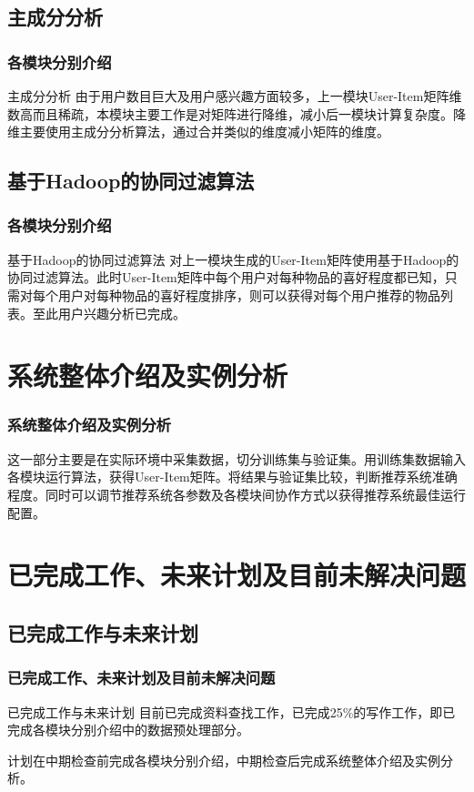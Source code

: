 \documentclass{beamer}
\begin{document}
\subsection{主成分分析}
\begin{frame}
	\frametitle{各模块分别介绍}
		\begin{block}{主成分分析}
		由于用户数目巨大及用户感兴趣方面较多，上一模块User-Item矩阵维数高而且稀疏，本模块主要工作是对矩阵进行降维，减小后一模块计算复杂度。降维主要使用主成分分析算法，通过合并类似的维度减小矩阵的维度。
		\end{block}
\end{frame}

\subsection{基于Hadoop的协同过滤算法}
\begin{frame}
	\frametitle{各模块分别介绍}
		\begin{block}{基于Hadoop的协同过滤算法}
		对上一模块生成的User-Item矩阵使用基于Hadoop的协同过滤算法。此时User-Item矩阵中每个用户对每种物品的喜好程度都已知，只需对每个用户对每种物品的喜好程度排序，则可以获得对每个用户推荐的物品列表。至此用户兴趣分析已完成。
		\end{block}
\end{frame}


\section{系统整体介绍及实例分析}
\begin{frame}
	\frametitle{系统整体介绍及实例分析}
		这一部分主要是在实际环境中采集数据，切分训练集与验证集。用训练集数据输入各模块运行算法，获得User-Item矩阵。将结果与验证集比较，判断推荐系统准确程度。同时可以调节推荐系统各参数及各模块间协作方式以获得推荐系统最佳运行配置。
\end{frame}

\section{已完成工作、未来计划及目前未解决问题}
\subsection{已完成工作与未来计划}
\begin{frame}
	\frametitle{已完成工作、未来计划及目前未解决问题}
		\begin{block}{已完成工作与未来计划}
		目前已完成资料查找工作，已完成25\%的写作工作，即已完成各模块分别介绍中的数据预处理部分。

		计划在中期检查前完成各模块分别介绍，中期检查后完成系统整体介绍及实例分析。
		\end{block}
\end{frame}
\end{document}
